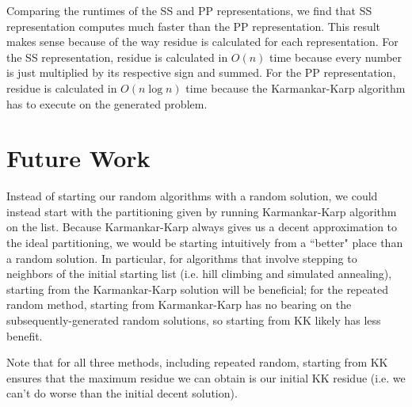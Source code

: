 \documentclass[a4paper]{article}
\begin{document}
	Comparing the runtimes of the SS and PP representations, we find that SS representation computes much faster than the PP representation. This result makes sense because of the way residue is calculated for each representation. For the SS representation, residue is calculated in $O(n)$ time because every number is just multiplied by its respective sign and summed. For the PP representation, residue is calculated in $O(n\log n)$ time because the Karmankar-Karp algorithm has to execute on the generated problem.
	

	
	\section{Future Work}
	
	Instead of starting our random algorithms with a random solution, we could instead start with the partitioning given by running Karmankar-Karp algorithm on the list. Because Karmankar-Karp always gives us a decent approximation to the ideal partitioning, we would be starting intuitively from a ``better" place than a random solution. In particular, for algorithms that involve stepping to neighbors of the initial starting list (i.e. hill climbing and simulated annealing), starting from the Karmankar-Karp solution will be beneficial; for the repeated random method, starting from Karmankar-Karp has no bearing on the subsequently-generated random solutions, so starting from KK likely has less benefit.
	
	Note that for all three methods, including repeated random, starting from KK ensures that the maximum residue we can obtain is our initial KK residue (i.e. we can't do worse than the initial decent solution).
	
\end{document}
